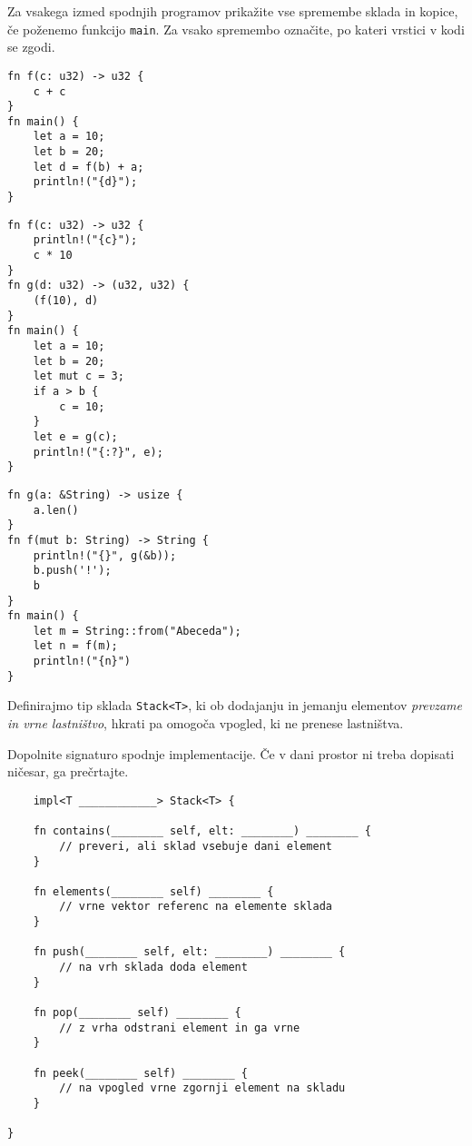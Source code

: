 \documentclass[11pt]{../izpit}
\begin{document}


\naloga[\tocke{10}]

Za vsakega izmed spodnjih programov prikažite vse spremembe sklada in kopice, če poženemo funkcijo \texttt{main}. Za vsako spremembo označite, po kateri vrstici v kodi se zgodi.

\podnaloga
\begin{verbatim}
fn f(c: u32) -> u32 {
    c + c
}
fn main() {
    let a = 10;
    let b = 20;
    let d = f(b) + a;
    println!("{d}");
}
\end{verbatim}

\podnaloga
\begin{verbatim}
fn f(c: u32) -> u32 {
    println!("{c}");
    c * 10
}
fn g(d: u32) -> (u32, u32) {
    (f(10), d)
}
fn main() {
    let a = 10;
    let b = 20;
    let mut c = 3;
    if a > b {
        c = 10;
    }
    let e = g(c);
    println!("{:?}", e);
}
\end{verbatim}

\podnaloga
\begin{verbatim}
fn g(a: &String) -> usize {
    a.len()
}
fn f(mut b: String) -> String {
    println!("{}", g(&b));
    b.push('!');
    b
}
fn main() {
    let m = String::from("Abeceda");
    let n = f(m);
    println!("{n}")
}
\end{verbatim}




\naloga[\tocke{10}]

Definirajmo tip sklada \texttt{Stack<T>}, ki ob dodajanju in jemanju elementov \emph{prevzame in vrne lastništvo}, hkrati pa omogoča vpogled, ki ne prenese lastništva. 

Dopolnite signaturo spodnje implementacije. Če v dani prostor ni treba dopisati ničesar, ga prečrtajte.

{\Large
\begin{verbatim}
    impl<T ____________> Stack<T> {

    fn contains(________ self, elt: ________) ________ {
        // preveri, ali sklad vsebuje dani element
    }
    
    fn elements(________ self) ________ {
        // vrne vektor referenc na elemente sklada
    }
    
    fn push(________ self, elt: ________) ________ {
        // na vrh sklada doda element
    }
    
    fn pop(________ self) ________ {
        // z vrha odstrani element in ga vrne
    }
    
    fn peek(________ self) ________ {
        // na vpogled vrne zgornji element na skladu
    }

}
\end{verbatim}
}
\end{document}
